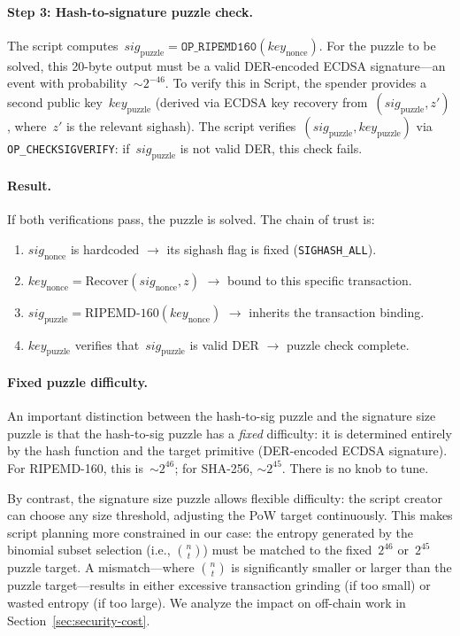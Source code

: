 \documentclass[11pt, a4paper]{article}
\begin{document}
\paragraph{Step 3: Hash-to-signature puzzle check.}
The script computes~$\mathit{sig}_{\mathrm{puzzle}} = \texttt{OP\_RIPEMD160}(\mathit{key}_{\mathrm{nonce}})$. For the puzzle to be solved, this 20-byte output must be a valid DER-encoded ECDSA signature---an event with probability~${\sim}2^{-46}$. To verify this in Script, the spender provides a second public key~$\mathit{key}_{\mathrm{puzzle}}$ (derived via ECDSA key recovery from~$(\mathit{sig}_{\mathrm{puzzle}}, z')$, where~$z'$ is the relevant sighash). The script verifies~$(\mathit{sig}_{\mathrm{puzzle}}, \mathit{key}_{\mathrm{puzzle}})$ via \texttt{OP\_CHECKSIGVERIFY}: if~$\mathit{sig}_{\mathrm{puzzle}}$ is not valid DER, this check fails.

\paragraph{Result.}
If both verifications pass, the puzzle is solved. The chain of trust is:
\begin{enumerate}
    \item $\mathit{sig}_{\mathrm{nonce}}$ is hardcoded $\to$ its sighash flag is fixed (\texttt{SIGHASH\_ALL}).
    \item $\mathit{key}_{\mathrm{nonce}} = \text{Recover}(\mathit{sig}_{\mathrm{nonce}}, z)$ $\to$ bound to this specific transaction.
    \item $\mathit{sig}_{\mathrm{puzzle}} = \text{RIPEMD-160}(\mathit{key}_{\mathrm{nonce}})$ $\to$ inherits the transaction binding.
    \item $\mathit{key}_{\mathrm{puzzle}}$ verifies that~$\mathit{sig}_{\mathrm{puzzle}}$ is valid DER $\to$ puzzle check complete.
\end{enumerate}

\paragraph{Fixed puzzle difficulty.}
An important distinction between the hash-to-sig puzzle and the signature size puzzle is that the hash-to-sig puzzle has a \emph{fixed} difficulty: it is determined entirely by the hash function and the target primitive (DER-encoded ECDSA signature). For RIPEMD-160, this is~${\sim}2^{46}$; for SHA-256, ${\sim}2^{45}$. There is no knob to tune.

By contrast, the signature size puzzle allows flexible difficulty: the script creator can choose any size threshold, adjusting the PoW target continuously. This makes script planning more constrained in our case: the entropy generated by the binomial subset selection (i.e., $\binom{n}{t}$) must be matched to the fixed~$2^{46}$ or~$2^{45}$ puzzle target. A mismatch---where $\binom{n}{t}$ is significantly smaller or larger than the puzzle target---results in either excessive transaction grinding (if too small) or wasted entropy (if too large). We analyze the impact on off-chain work in Section~\ref{sec:security-cost}.
\end{document}
